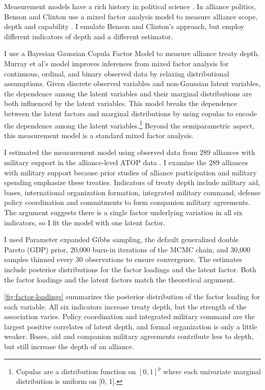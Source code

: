 \documentclass[12pt]{article}
\begin{document}
Measurement models have a rich history in political science \citep{Clintonetal2004, TreierJackman2008, Fariss2014}.
In alliance politics, Benson and Clinton use a mixed factor analysis model to measure alliance scope, depth and capability \citep{BensonClinton2016, Quinn2004}.  
I emulate Benson and Clinton's approach, but employ different indicators of depth and a different estimator. 


I use a Bayesian Gaussian Copula Factor Model \citep{Murrayetal2013} to measure alliance treaty depth. 
Murray et al's model improves inferences from mixed factor analysis for continuous, ordinal, and binary observed data by relaxing distributional assumptions. 
Given discrete observed variables and non-Gaussian latent variables, the dependence among the latent variables and their marginal distributions are both influenced by the latent variables.
This model breaks the dependence between the latent factors and marginal distributions by using copulas to encode the dependence among the latent variables.\footnote{Copulas are a distribution function on $[0, 1]^p$ where each univariate marginal distribution is uniform on [0, 1].}
Beyond the semiparametric aspect, this measurement model is a standard mixed factor analysis.


I estimated the measurement model using observed data from 289 alliances with military support in the alliance-level ATOP data \citep{Leedsetal2002}. 
I examine the 289 alliances with military support because prior studies of alliance participation and military spending emphasize these treaties.
Indicators of treaty depth include military aid, bases, international organization formation, integrated military command, defense policy coordination and commitments to form companion military agreements. 
The argument suggests there is a single factor underlying variation in all six indicators, so I fit the model with one latent factor. 


I used Parameter expanded Gibbs sampling, the default generalized double Pareto (GDP) prior, 20,000 burn-in iterations of the MCMC chain, and 30,000 samples thinned every 30 observations to ensure convergence. 
The estimates include posterior distributions for the factor loadings and the latent factor. 
Both the factor loadings and the latent factors match the theoretical argument. 


\autoref{fig:factor-loadings} summarizes the posterior distribution of the factor loading for each variable. 
All six indicators increase treaty depth, but the strength of the association varies. 
Policy coordination and integrated military command are the largest positive correlates of latent depth, and formal organization is only a little weaker.
Bases, aid and companion military agreements contribute less to depth, but still increase the depth of an alliance. 
 
\end{document}
